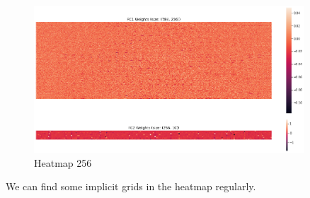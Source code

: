 \documentclass[a4paper, 11pt]{article} %
\begin{document}
\begin{figure}[H]
	\centering
	\includegraphics[width=0.9\textwidth]{./img/heatmap-256.png}
	\caption{Heatmap 256}
\end{figure}

We can find some implicit grids in the heatmap regularly.

\bigskip



\end{document}
